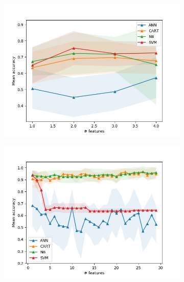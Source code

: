 \begin{figure}[htbp]
  \centering
  \begin{subfigure}[b]{0.475\textwidth}
      \centering
      \includegraphics[width=\textwidth]{../plots_with_std_fill/Cleaned_data_sf_combined.png}
      \caption[]%
      {{\small}}
      \label{fig:EN_sfs}
  \end{subfigure}
  \hfill
  \begin{subfigure}[b]{0.475\textwidth}
      \centering
      \includegraphics[width=\textwidth]{../plots_with_std_fill/data_FNA_sf_combined.png}
      \caption[]%
      {{\small}}
      \label{fig:WBCD_sfs}
  \end{subfigure}


\end{figure}
